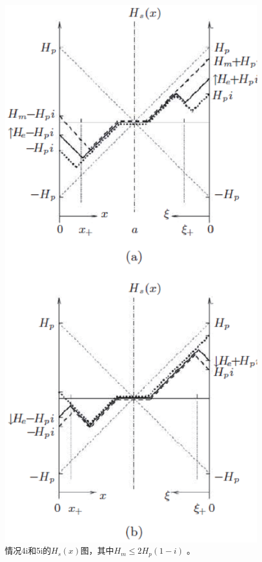 \begin{figure}[htbp]
	\centering
	\includegraphics[scale=0.7]{chpt7/figs/fig7.15.eps}
	\caption{情况4i和5i的$H_s(x)$图，其中$H_m\le 2H_p(1−i)$ 。}
\end{figure}

